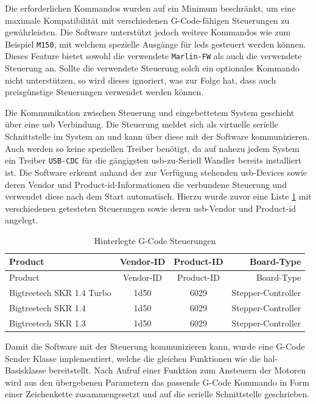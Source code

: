 Die erforderlichen Kommandos wurden auf ein Minimum beschränkt, um eine
maximale Kompatibilität mit verschiedenen G-Code-fähigen Steuerungen zu
gewährleisten. Die Software unterstützt jedoch weitere Kommandos wie zum
Beispiel \passthrough{\lstinline!M150!}, mit welchem spezielle Ausgänge
für \gls{led}s gesteuert werden können. Dieses Feature bietet sowohl die
verwendete \passthrough{\lstinline!Marlin-FW!} als auch die verwendete
Steuerung an. Sollte die verwendete Steuerung solch ein optionales
Kommando nicht unterstützen, so wird dieses ignoriert, was zur Folge
hat, dass auch preisgünstige Steuerungen verwendet werden können.

Die Kommunikation zwischen Steuerung und eingebettetem System geschieht
über eine \gls{usb} Verbindung. Die Steuerung meldet sich als virtuelle
serielle Schnittstelle im System an und kann über diese mit der Software
kommunizieren. Auch werden so keine speziellen Treiber benötigt, da auf
nahezu jedem System ein Treiber \passthrough{\lstinline!USB-CDC!} für
die gängigsten \gls{usb}-zu-Seriell Wandler bereits installiert ist. Die
Software erkennt anhand der zur Verfügung stehenden \gls{usb}-Devices
sowie deren Vendor und Product-\gls{id}-Informationen die verbundene
Steuerung und verwendet diese nach dem Start automatisch. Hierzu wurde
zuvor eine Liste \ref{gcodeusbctl} mit verschiedenen getesteten
Steuerungen sowie deren \gls{usb}-Vendor und Product-\gls{id} angelegt.

\begin{longtable}[]{@{}lccr@{}}
\caption{Hinterlegte G-Code Steuerungen
\label{gcodeusbctl}}\tabularnewline
\toprule
Product & Vendor-ID & Product-ID & Board-Type\tabularnewline
\midrule
\endfirsthead
\toprule
Product & Vendor-ID & Product-ID & Board-Type\tabularnewline
\midrule
\endhead
Bigtreetech SKR 1.4 Turbo & 1d50 & 6029 &
Stepper-Controller\tabularnewline
Bigtreetech SKR 1.4 & 1d50 & 6029 & Stepper-Controller\tabularnewline
Bigtreetech SKR 1.3 & 1d50 & 6029 & Stepper-Controller\tabularnewline
\bottomrule
\end{longtable}

Damit die Software mit der Steuerung kommunizieren kann, wurde eine
G-Code Sender Klasse implementiert, welche die gleichen Funktionen wie
die \gls{hal}-Basisklasse bereitstellt. Nach Aufruf einer Funktion zum
Ansteuern der Motoren wird aus den übergebenen Parametern das passende
G-Code Kommando in Form einer Zeichenkette zusammengesetzt und auf die
serielle Schnittstelle geschrieben.

